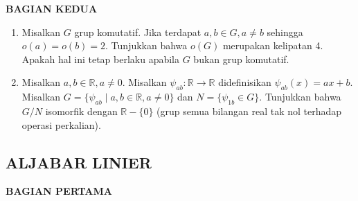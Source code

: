 \documentclass[12pt,twoside]{article}
\begin{document}
\newpage \textbf{BAGIAN KEDUA}
\begin{enumerate}
	\item Misalkan $G$ grup komutatif. Jika terdapat $a,b\in G, a\neq b$ sehingga $o(a)=o(b)=2$. Tunjukkan bahwa $o(G)$ merupakan kelipatan 4. Apakah hal ini tetap berlaku apabila $G$ bukan grup komutatif.

	\item Misalkan $a,b\in \mathbb{R},a\neq 0$. Misalkan $\psi_{ab}:\mathbb{R}\to \mathbb{R}$ didefinisikan $\psi_{ab}(x)=ax+b$. Misalkan $G=\{\psi_{ab}\mid a,b\in \mathbb{R},a\neq 0\}$ dan $N=\{\psi_{1b}\in G\}$. Tunjukkan  bahwa $G/N$ isomorfik dengan $\mathbb{R}-\{0\}$ (grup semua bilangan real tak nol terhadap operasi perkalian).


\end{enumerate}
\newpage \subsection{ALJABAR LINIER }
\textbf{BAGIAN PERTAMA}
\end{document}
